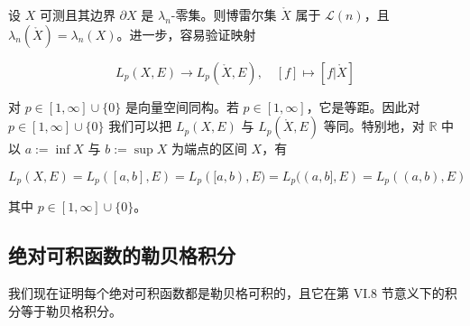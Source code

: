 \begin{remark}

设 $ X $ 可测且其边界 $ \partial X $ 是 $ \lambda_{n} $-零集。则博雷尔集 $ \mathring{X} $ 属于 $ \mathcal{L}(n) $，且 $ \lambda_{n}(\mathring{X}) = \lambda_{n}(X) $。进一步，容易验证映射

\[
L_{p}(X,E) \to L_{p}(\mathring{X},E) , \quad [f] \mapsto [f|\mathring{X}]
\]

对 $ p \in [1,\infty] \cup \{0\} $ 是向量空间同构。若 $ p \in [1,\infty] $，它是等距。因此对 $ p \in [1,\infty] \cup \{0\} $ 我们可以把 $ L_{p}(X,E) $ 与 $ L_{p}(\mathring{X},E) $ 等同。特别地，对 $ \mathbb{R} $ 中以 $ a := \inf X $ 与 $ b := \sup X $ 为端点的区间 $ X $，有

\[
L_{p}(X,E) = L_{p}([a,b],E) = L_{p}([a,b),E) = L_{p}((a,b],E) = L_{p}((a,b),E)
\]

其中 $ p \in [1,\infty] \cup \{0\} $。

\end{remark}

\subsection*{绝对可积函数的勒贝格积分}

我们现在证明每个绝对可积函数都是勒贝格可积的，且它在第 VI.8 节意义下的积分等于勒贝格积分。

